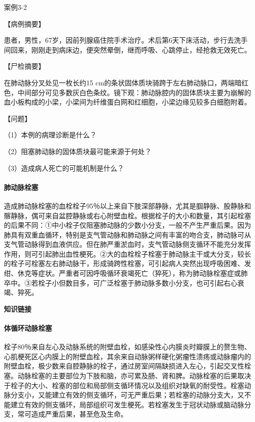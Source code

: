\begin{framed}
  {案例3-2}

  {【病例摘要】}

  患者，男性，67岁，因前列腺癌住院手术治疗。术后第6天下床活动，步行去洗手间回来，刚刚走到病床边，便突然晕倒，继而呼吸、心跳停止，经抢救无效死亡。

  {【尸检摘要】}

  在肺动脉分叉处见一枚长约15
  cm的条状固体质块骑跨于左右肺动脉口，两端暗红色，中间部分可见多数灰白色条纹。镜下观：肺动脉腔内的固体质块主要为崩解的血小板构成的小梁，小梁间为纤维蛋白网和红细胞，小梁边缘见较多白细胞附着。

  {【问题】}

  （1）本例的病理诊断是什么？

  （2）阻塞肺动脉的固体质块最可能来源于何处？

  （3）造成病人死亡的可能机制是什么？
\end{framed}

\paragraph{肺动脉栓塞}
造成肺动脉栓塞的血栓栓子95％以上来自下肢深部静脉，尤其是腘静脉、股静脉和髂静脉，偶可来自盆腔静脉或右心附壁血栓。根据栓子的大小和数量，其引起栓塞的后果不同：①中小栓子仅阻塞肺动脉的少数小分支，一般不产生严重后果。因为肺具有双重血循环，特别是支气管动脉和肺动脉之间有丰富的吻合支，肺动脉可从支气管动脉得到血液供应。但在肺严重淤血时，支气管动脉侧支循环不能充分发挥作用，则可引起肺出血性梗死。②大的血栓栓子栓塞于肺动脉主干或大分支，较长的栓子可栓塞左右肺动脉干，形成骑跨性栓塞，可引起病人突然出现呼吸困难、发绀、休克等症状。严重者可因呼吸循环衰竭死亡（猝死），称为肺动脉栓塞症或肺卒中。③若栓子小但数目多，可广泛栓塞于肺动脉多数小分支，也可引起右心衰竭、猝死。

\begin{center}
  \textbf{知识链接}
\end{center}
\paragraph{体循环动脉栓塞}
栓子80％来自左心及动脉系统的附壁血栓，如感染性心内膜炎时瓣膜上的赘生物、心肌梗死区心内膜上的附壁血栓，其余来自动脉粥样硬化粥瘤性溃疡或动脉瘤内的附壁血栓，极少数来自腔静脉的栓子，通过房室间隔缺损进入左心，引起交叉性栓塞。动脉栓塞的主要部位为下肢和脑，亦可累及肠、肾和脾。动脉栓塞的后果取决于栓子的大小、栓塞的部位和局部侧支循环情况以及组织对缺氧的耐受性。栓塞动脉分支小，又能建立有效的侧支循环，可无严重后果；若栓塞的动脉分支大，又不能建立有效的侧支循环，局部组织可发生梗死。若栓塞发生于冠状动脉或脑动脉分支，常可造成严重后果，甚至危及生命。

